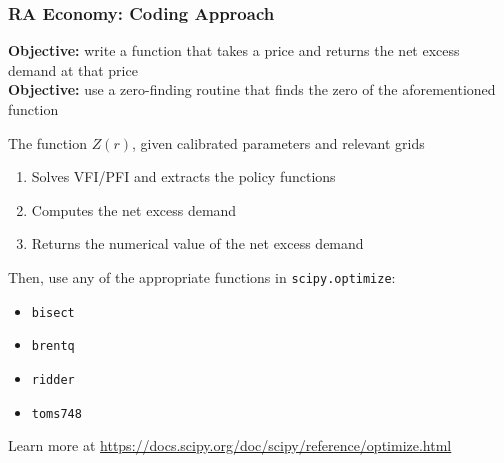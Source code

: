 \documentclass[10pt, aspectratio=1610, natbib, handout]{beamer}
\begin{document}
  \begin{frame}
    \frametitle{RA Economy: Coding Approach}

    \textbf{Objective:} write a function that takes a price and returns the net excess demand at that price \\
    \textbf{Objective:} use a zero-finding routine that finds the zero of the aforementioned function

    \vfill\pause

    The function $Z(r)$, given calibrated parameters and relevant grids
    \begin{enumerate}
      \item Solves VFI/PFI and extracts the policy functions
      \item Computes the net excess demand
      \item Returns the numerical value of the net excess demand
    \end{enumerate}

    \vfill\pause

    Then, use any of the appropriate functions in \texttt{scipy.optimize}:
    \begin{itemize}
      \item \texttt{bisect}
      \item \texttt{brentq}
      \item \texttt{ridder}
      \item \texttt{toms748}
    \end{itemize}

    \vfill

    Learn more at \url{https://docs.scipy.org/doc/scipy/reference/optimize.html}

  \end{frame}
\end{document}
